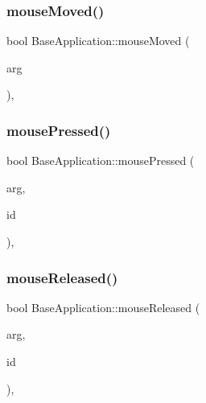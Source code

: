 \mbox{\label{class_base_application_a126e59cb246b061e51eb6ce06a2ee8f4}} 
\subsubsection{\texorpdfstring{mouse\+Moved()}{mouseMoved()}}
{\footnotesize\ttfamily bool Base\+Application\+::mouse\+Moved (\begin{DoxyParamCaption}\item[{const O\+I\+S\+::\+Mouse\+Event \&}]{arg }\end{DoxyParamCaption})\hspace{0.3cm}{\ttfamily [protected]}, {\ttfamily [virtual]}}

\mbox{\label{class_base_application_a9255dfc1eabefd11c474ec45a6622504}} 
\subsubsection{\texorpdfstring{mouse\+Pressed()}{mousePressed()}}
{\footnotesize\ttfamily bool Base\+Application\+::mouse\+Pressed (\begin{DoxyParamCaption}\item[{const O\+I\+S\+::\+Mouse\+Event \&}]{arg,  }\item[{O\+I\+S\+::\+Mouse\+Button\+ID}]{id }\end{DoxyParamCaption})\hspace{0.3cm}{\ttfamily [protected]}, {\ttfamily [virtual]}}

\mbox{\label{class_base_application_aa102c5859c14c0690c749994a446b53d}} 
\subsubsection{\texorpdfstring{mouse\+Released()}{mouseReleased()}}
{\footnotesize\ttfamily bool Base\+Application\+::mouse\+Released (\begin{DoxyParamCaption}\item[{const O\+I\+S\+::\+Mouse\+Event \&}]{arg,  }\item[{O\+I\+S\+::\+Mouse\+Button\+ID}]{id }\end{DoxyParamCaption})\hspace{0.3cm}{\ttfamily [protected]}, {\ttfamily [virtual]}}

